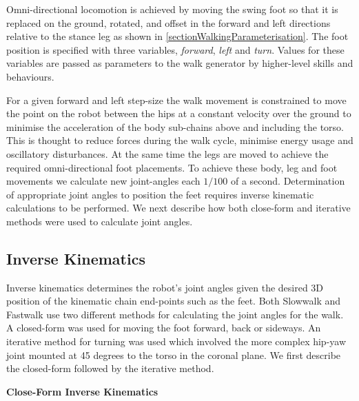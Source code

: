 \documentclass[pdftex,11pt,a4paper]{report}
\begin{document}
Omni-directional locomotion is achieved by moving the swing foot so that
it is replaced on the ground, rotated, and offset in the forward and left
directions relative to the stance leg as shown in \autoref{sectionWalkingParameterisation}. The foot position is specified with three variables, \emph{forward}, \emph{left} and \emph{turn}. Values for these variables are passed as parameters to the walk generator by higher-level skills and behaviours. 

For a given forward and left step-size the walk movement is constrained to move the point on the robot between the hips at a constant velocity over the ground to minimise the acceleration of the body sub-chains above and including the torso. This is thought to reduce forces during the walk cycle, minimise energy usage and oscillatory disturbances. At the same time the legs are moved to achieve the required omni-directional foot placements. To achieve these body, leg and foot movements we calculate new joint-angles each $1/100$ of a second. Determination of appropriate joint angles to position the feet requires inverse kinematic calculations to be performed. We next describe how both close-form and iterative methods were used to calculate joint angles.

\subsection{Inverse Kinematics} \label{sectionIK}
Inverse kinematics determines the robot's joint angles given the desired 3D position of the kinematic chain end-points such as the feet. Both Slowwalk and Fastwalk use two different methods for calculating the joint angles for the walk. A closed-form was used for moving the foot forward, back or sideways. An iterative method for turning was used which involved the more complex hip-yaw joint mounted at 45 degrees to the torso in the coronal plane. We first describe the closed-form followed by the iterative method. 

\textbf{Close-Form Inverse Kinematics}
\end{document}
